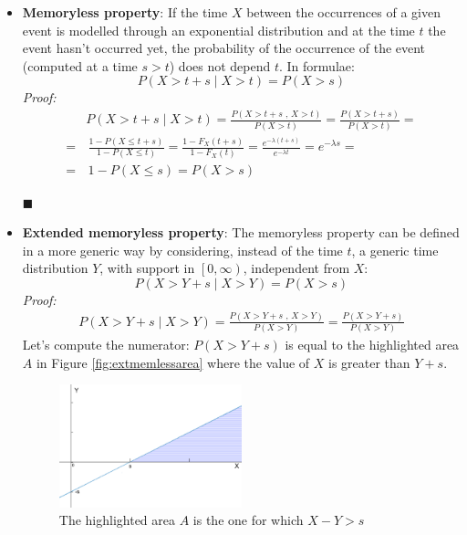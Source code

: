 \documentclass[12pt,a4paper]{article}
\begin{document}
\begin{itemize}
\item \textbf{Memoryless property}: 
If the time $X$ between the occurrences of a given event is modelled through an exponential distribution and at the time $t$ the event hasn't occurred yet, the probability of the occurrence of the event (computed at a time $s>t$) does not depend $t$. In formulae:
$$
P(X>t+s \mid X>t)= P(X>s)
$$
\emph{Proof:}
\begin{equation*}
\begin{split}
&P(X>t+s \mid X>t) = \frac{P(X>t+s \textrm{ , } X>t)}{P(X>t)} = \frac{P(X>t+s)}{P(X>t)}= \\
=&\, \frac{1-P(X\leq t+s)}{1-P(X\leq t)} =\frac{1-F_X(t+s)}{1-F_X(t)} = \frac{e^{-\lambda (t+s)}}{e^{-\lambda t}} = e^{-\lambda s} = \\
=&\, 1 - P(X \leq s) = P(X>s)
\end{split}
\end{equation*}
\begin{flushright}
$\blacksquare$
\end{flushright}
\item \textbf{Extended memoryless property}:
The memoryless property can be defined in a more generic way by considering, instead of the time $t$, a generic time distribution $Y$, with support in $\left[0,\infty \right)$, independent from $X$:
$$
P(X>Y+s \mid X>Y)=P(X>s)
$$
\emph{Proof:}
\begin{equation*}
\begin{split}
P(X>Y+s \mid X>Y) = \frac{P(X>Y+s \textrm{ , } X>Y)}{P(X>Y)} = \frac{P(X>Y+s)}{P(X>Y)} 
\end{split}
\end{equation*}
Let's compute the numerator: $P(X>Y+s)$ is equal to the highlighted area $A$ in Figure \ref{fig:extmemlessarea} where the value of $X$ is greater than $Y+s$.
\begin{figure}[H]
\begin{center}
\includegraphics[width=0.5\textwidth]{IMG/CommArea.eps}
\caption{The highlighted area $A$ is the one for which $X-Y>s$}

\end{center}
\end{figure}
\end{itemize}
\end{document}
